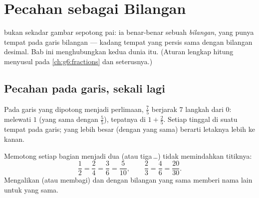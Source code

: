 \chapter{Pecahan sebagai Bilangan}\label{ch:g5:fractions}

 bukan sekadar gambar sepotong pai: ia benar-benar sebuah
\emph{bilangan}, yang punya tempat pada garis bilangan --- kadang
tempat yang persis sama dengan bilangan desimal. Bab ini
menghubungkan kedua dunia itu. (Aturan lengkap hitung 
menyusul pada \cref{ch:g6:fractions} dan seterusnya.)

\section{Pecahan pada garis, sekali lagi}

\begin{example}\label{ex:g5:fractions:place}
Pada garis yang dipotong menjadi perlimaan, $\frac{7}{5}$ berjarak
$7$ langkah dari $0$: melewati $1$ (yang sama dengan $\frac55$),
tepatnya di $1 + \frac25$. Setiap  tinggal di suatu tempat
pada garis;  yang lebih besar (dengan  yang sama)
berarti letaknya lebih ke kanan.
\end{example}

\begin{proposition}\label{prop:g5:fractions:equal}
Memotong setiap bagian menjadi dua (atau tiga\,\dots) tidak
memindahkan titiknya:
\[
\frac{1}{2} = \frac{2}{4} = \frac{3}{6} = \frac{5}{10},
\qquad
\frac{2}{3} = \frac{4}{6} = \frac{20}{30}.
\]
Mengalikan (atau membagi)  dan  dengan bilangan
yang sama memberi nama lain untuk  yang sama.
\end{proposition}
\admitted

